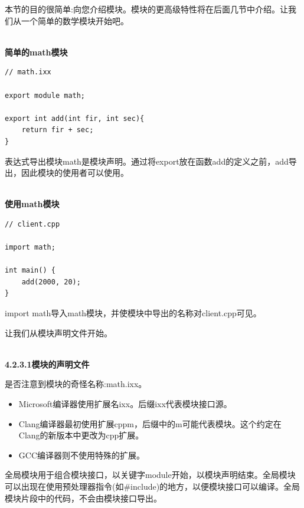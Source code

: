 
本节的目的很简单:向您介绍模块。模块的更高级特性将在后面几节中介绍。让我们从一个简单的数学模块开始吧。

\hspace*{\fill} \\ %
\noindent
\textbf{简单的math模块}
\begin{lstlisting}[style=styleCXX]
// math.ixx

export module math;

export int add(int fir, int sec){
	return fir + sec;
}
\end{lstlisting}

表达式导出模块math是模块声明。通过将export放在函数add的定义之前，add导出，因此模块的使用者可以使用。

\hspace*{\fill} \\ %
\noindent
\textbf{使用math模块}
\begin{lstlisting}[style=styleCXX]
// client.cpp

import math;

int main() {
	add(2000, 20);
}
\end{lstlisting}

import math导入math模块，并使模块中导出的名称对client.cpp可见。

让我们从模块声明文件开始。

\hspace*{\fill} \\ %
\noindent
\textbf{4.2.3.1\hspace{0.2cm}模块的声明文件}

是否注意到模块的奇怪名称:math.ixx。

\begin{itemize}
\item 
Microsoft编译器使用扩展名ixx。后缀ixx代表模块接口源。

\item 
Clang编译器最初使用扩展cppm，后缀中的m可能代表模块。这个约定在Clang的新版本中更改为cpp扩展。

\item 
GCC编译器则不使用特殊的扩展。
\end{itemize}

全局模块用于组合模块接口，以关键字module开始，以模块声明结束。全局模块可以出现在使用预处理器指令(如\#include)的地方，以便模块接口可以编译。全局模块片段中的代码，不会由模块接口导出。

